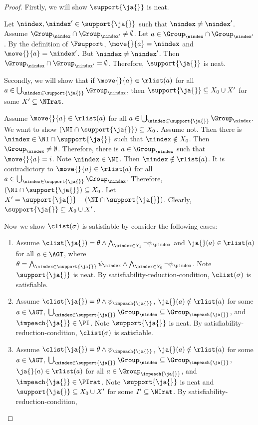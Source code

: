 \begin{proof}
  Firstly, we will show $\support{\ja{}}$ is neat. 
  
  Let $\nindex,\nindex'\in \support{\ja{}}$ such that $\nindex\neq \nindex'$. Assume $\Group_\nindex\cap \Group_{\nindex'}\neq \emptyset $. Let $a\in \Group_\nindex\cap \Group_{\nindex'}$. By the definition of $\Fsupport$, $\move{}{a}=\nindex$ and $\move{}{a}=\nindex'$. But $\nindex\neq \nindex'$. Then $\Group_\nindex\cap \Group_{\nindex'}= \emptyset $. Therefore, $\support{\ja{}}$ is neat.

  Secondly, we will show that 
  if $\move{}{a}\in \rlist(a)$ for all $a\in \bigcup_{\nindex\in \support{\ja{}}}\Group_\nindex$, then $\support{\ja{}}\subseteq X_0\cup X'$ for some $X'\subseteq \NIrat$.
 
  Assume $\move{}{a}\in \rlist(a)$ for all $a\in \bigcup_{\nindex\in \support{\ja{}}}\Group_\nindex$. We want to show $(\NI\cap \support{\ja{}})\subseteq X_0$. Assume not. Then there is $\nindex\in \NI\cap \support{\ja{}}$ such that $\nindex\notin X_0$. Then $\Group_\nindex\neq \emptyset $. Therefore, there is $a\in \Group_\nindex$ such that $\move{}{a}=i$. Note $\nindex\in \NI$. Then $\nindex\notin \rlist(a)$. It is contradictory to $\move{}{a}\in \rlist(a)$ for all $a\in \bigcup_{\nindex\in \support{\ja{}}}\Group_\nindex$. Therefore, $(\NI\cap \support{\ja{}})\subseteq X_0$. Let $X'=\support{\ja{}}-(\NI\cap \support{\ja{}})$. Clearly, $\support{\ja{}}\subseteq X_0\cup X'$.

  Now we show $\clist(\sigma)$ is satisfiable by consider the following cases:
  \begin{enumerate}[label={Case \arabic*}]
    \item Assume $\clist(\ja{})=\theta \wedge \bigwedge_{\pindex\in Y_1}\neg \psi_\pindex$ and $\ja{}(a)\in \rlist(a)$ for all $a\in \AGT$, where $\theta = \bigwedge_{\nindex\in \support{\ja{}}}\psi_\nindex \wedge \bigwedge_{\pindex \in Y_{0}}\neg \psi_\pindex$. Note $\support{\ja{}}$ is neat. By satisfiability-reduction-con\-di\-tion, $\clist(\sigma)$ is satisfiable.
    \item Assume $\clist(\ja{})=\theta \wedge \psi_{\impeach{\ja{}}}$, $\ja{}(a)\notin \rlist(a)$ for some $a\in \AGT$,
    $\bigcup_{\nindex\in \support{\ja{}}}\Group_\nindex\subseteq \Group_\impeach{\ja{}}$, and $\impeach{\ja{}}\in \PI$. Note $\support{\ja{}}$ is neat. By satisfiabili\-ty-reduction-condition, $\clist(\sigma)$ is satisfiable.
    \item Assume $\clist(\ja{})=\theta \wedge \psi_{\impeach{\ja{}}}$, $\ja{}(a)\notin \rlist(a)$ for some $a\in \AGT$,
    $\bigcup_{\nindex\in \support{\ja{}}}\Group_\nindex\subseteq \Group_\impeach{\ja{}}$, $\ja{}(a)\in \rlist(a)$ for all $a\in \Group_\impeach{\ja{}}$, and $\impeach{\ja{}}\in \PIrat$. Note $\support{\ja{}}$ is neat and $\support{\ja{}}\subseteq X_0\cup X'$ for some $I'\subseteq \NIrat$. By satisfiability-reduction-condition, 
    

\end{enumerate}
\end{proof}
